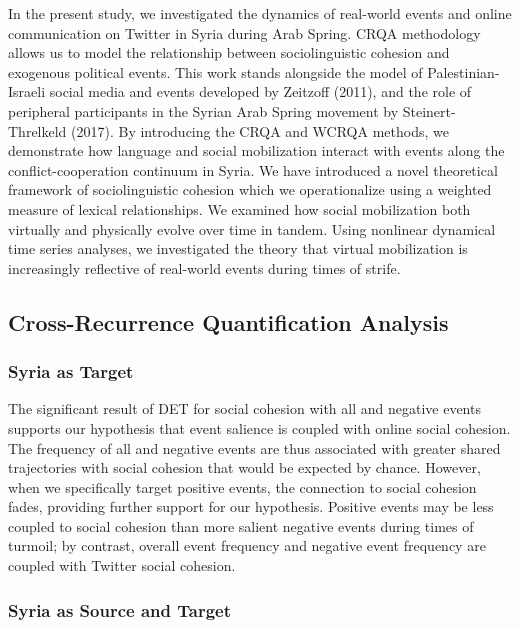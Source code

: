 \documentclass[english,man]{apa6}
\begin{document}
In the present study, we investigated the dynamics of real-world events
and online communication on Twitter in Syria during Arab Spring.
CRQA methodology allows us to model the relationship between sociolinguistic
cohesion and exogenous political events. This work stands alongside the model
of Palestinian-Israeli social media and events developed by Zeitzoff (2011),
and the role of peripheral participants in the Syrian Arab Spring movement by
Steinert-Threlkeld (2017). By introducing the CRQA and WCRQA methods, we
demonstrate how language and social mobilization interact with events along
the conflict-cooperation continuum in Syria. We have introduced a novel
theoretical framework of sociolinguistic cohesion which we operationalize
using a weighted measure of lexical relationships. We examined
how social mobilization both virtually and physically evolve over time in
tandem. Using nonlinear dynamical time series analyses, we investigated the
theory that virtual mobilization is increasingly reflective of real-world
events during times of strife.

\hypertarget{cross-recurrence-quantification-analysis-2}{%
\subsection{Cross-Recurrence Quantification Analysis}\label{cross-recurrence-quantification-analysis-2}}

\hypertarget{syria-as-target-2}{%
\subsubsection{Syria as Target}\label{syria-as-target-2}}

The significant result of DET for social cohesion with all and negative
events supports our hypothesis that event salience is coupled with online
social cohesion. The frequency of all and negative events are thus associated
with greater shared trajectories with social cohesion that would be expected
by chance. However, when we specifically target positive events, the connection
to social cohesion fades, providing further support for our hypothesis.
Positive events may be less coupled to social cohesion than more salient
negative events during times of turmoil; by contrast, overall event frequency
and negative event frequency are coupled with Twitter social cohesion.

\hypertarget{syria-as-source-and-target-2}{%
\subsubsection{Syria as Source and Target}\label{syria-as-source-and-target-2}}
\end{document}
